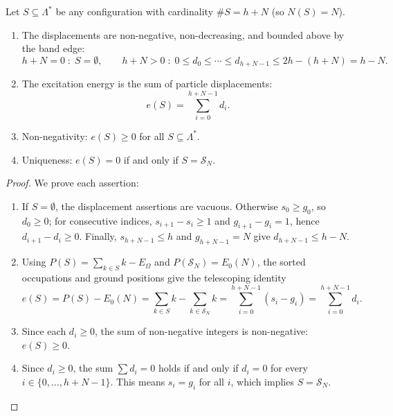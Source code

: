 \begin{theorem}
\label{thm:rank_formula}
Let $S \subseteq \Lambda^*$ be any configuration with cardinality $\#S = h + N$ (so $N(S) = N$). 
\begin{enumerate}
    \item The displacements are non-negative, non-decreasing, and bounded above by the band edge:
    \begin{equation}
    h+N=0\;:\;S=\emptyset,\qquad
    h+N>0\;:\;0\le d_0\le\cdots\le d_{h+N-1}\le 2h-(h+N)=h-N.
    \end{equation}
    \item The excitation energy is the sum of particle displacements:
    \begin{equation}
    e(S) = \sum_{i=0}^{h+N-1} d_i.
    \end{equation}
    \item Non-negativity: $e(S) \ge 0$ for all $S \subseteq \Lambda^*$.
    \item Uniqueness: $e(S) = 0$ if and only if $S = \mathcal{S}_N$.
\end{enumerate}
\end{theorem}

\begin{proof}
We prove each assertion:
\begin{enumerate}
    \item If $S=\emptyset$, the displacement assertions are vacuous. Otherwise $s_0\ge g_0$, so $d_0\ge0$; for consecutive indices, $s_{i+1}-s_i\ge1$ and $g_{i+1}-g_i=1$, hence $d_{i+1}-d_i\ge0$. Finally, $s_{h+N-1}\le h$ and $g_{h+N-1}=N$ give $d_{h+N-1}\le h-N$.

    \item Using $P(S)=\sum_{k\in S}k-E_\Omega$ and $P(\mathcal S_N)=E_0(N)$, the sorted occupations and ground positions give the telescoping identity
    \begin{equation}
    e(S)=P(S)-E_0(N)=\sum_{k\in S}k-\sum_{k\in\mathcal S_N}k
    =\sum_{i=0}^{h+N-1}(s_i-g_i)=\sum_{i=0}^{h+N-1}d_i.
    \end{equation}
    \item Since each $d_i \ge 0$, the sum of non-negative integers is non-negative: $e(S) \ge 0$.
    
    \item Since $d_i \ge 0$, the sum $\sum d_i = 0$ holds if and only if $d_i = 0$ for every $i \in \{0, \dots, h+N-1\}$.
    This means $s_i = g_i$ for all $i$, which implies $S = \mathcal{S}_N$.
\end{enumerate}
\end{proof}

